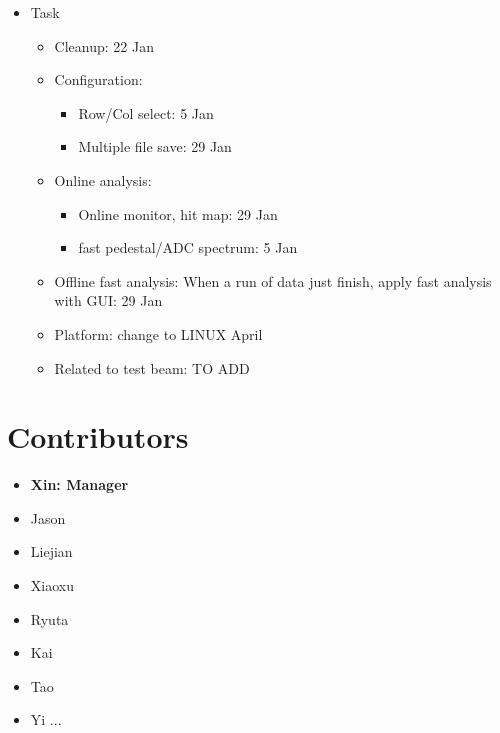 \documentclass{article}
\begin{document}
        \begin{itemize}
            
            \item Task
                
                \begin{itemize}
                    
                    \item Cleanup: 22 Jan
                    \item Configuration:
                        
                        \begin{itemize}
                            
                            \item Row/Col select: 5 Jan
                            \item Multiple file save:  29 Jan
                                
                        \end{itemize}
                            
                    \item Online analysis:
                        
                        \begin{itemize} 
                            
                            \item Online monitor, hit map: 29 Jan
                            \item fast pedestal/ADC spectrum: 5 Jan
                                
                        \end{itemize}
                            
                    \item Offline fast analysis: When  a run of data just finish, apply fast analysis with GUI: 29 Jan
                    \item Platform: change to LINUX  April
                    \item Related to test beam: TO ADD 
                        
                \end{itemize}
                
                
        \end{itemize}
        
        
    



\section{Contributors}

    \begin{itemize}
    
        \item \textbf{Xin: Manager}
        \item Jason
        \item Liejian
        \item Xiaoxu
        \item Ryuta
        \item Kai
        \item Tao
        \item Yi
        ...
        
    \end{itemize}
\end{document}
